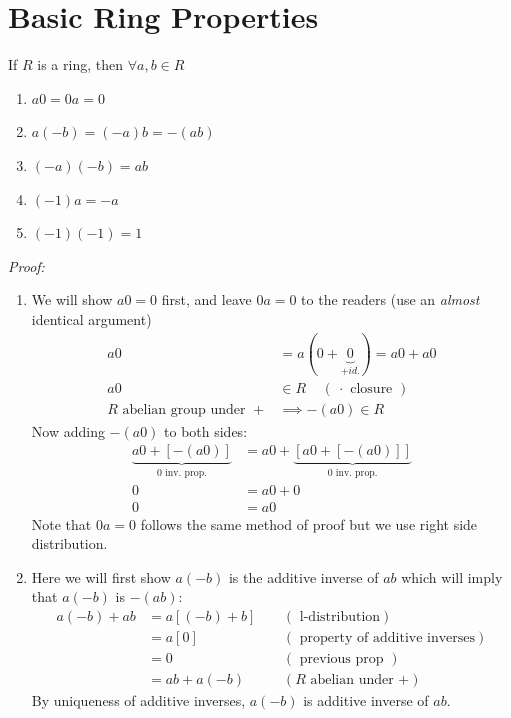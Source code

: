 \section{Basic Ring Properties}
\begin{lemma}
If $R$ is a ring, then $\forall a,b\in R$
\begin{enumerate}[label=(\roman*)]
    \item $a0=0a=0$
    \item $a(-b)=(-a)b=-(ab)$
    \item $(-a)(-b)=ab$
    \item $(-1)a=-a$
    \item $(-1)(-1)=1$
\end{enumerate}
\noindent\textit{Proof:}
\begin{enumerate}[label=(\roman*)]
\item We will show $a0=0$ first, and leave $0a=0$ to the readers (use an \textit{almost} identical
argument)
\begin{align}
        a0&=a(0+\underbrace{0}_{+ id.})=a0+a0 \nonumber \\
        a0&\in R \ \ \ \ \ (\ \cdot \text{ closure }) \nonumber \\
        R \text{ abelian group under }+ &\implies -(a0)\in R \nonumber
    \end{align}
    Now adding $-(a0)$ to both sides:
    \begin{align}
        \underbrace{a0+[-(a0)]}_{0 \text{ inv. prop.}}&=a0+\underbrace{[a0+[-(a0)]]}_{0 \text{ inv. prop.}} \nonumber \\
        0&=a0+0 \nonumber \\
        0&= a0 \nonumber
    \end{align}
    Note that $0a=0$ follows the same method of proof but we use right side distribution.
    \item Here we will first show $a(-b)$ is the additive inverse of $ab$ which will imply that
    $a(-b)$ is $-(ab)$:
    \begin{align}
        a(-b)+ab&= a[(-b)+b] \ \ \ \ \ &(\text{ l-distribution}) \nonumber \\
        &= a[0] \ \ \ \ \ &(\text{ property of additive inverses}) \nonumber \\
        &= 0 \ \ \ \ \ &(\text{ previous prop }) \nonumber \\
        &= ab+a(-b) \ \ \ \ \ &(R \text{ abelian under +}) \nonumber
    \end{align}
    By uniqueness of additive inverses, $a(-b)$ is additive inverse of $ab$. \\

\end{enumerate}
\end{lemma}
